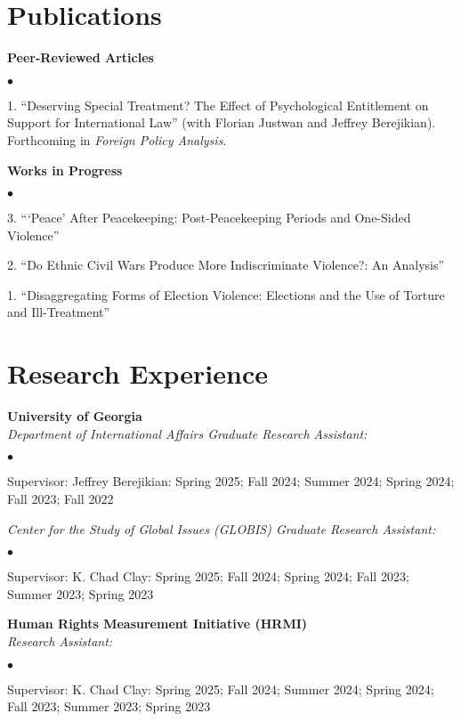 \documentclass[letterpaper,12pt]{article}
\newenvironment{list2}{
  \begin{list}{$\bullet$}{%
      \setlength{\itemsep}{0in}
      \setlength{\parsep}{0in} 
      \setlength{\parskip}{0in}
      \setlength{\topsep}{0in} 
      \setlength{\partopsep}{0in}
      \setlength{\leftmargin}{1in}
      \setlength{\labelsep}{1em}
      \setlength{\labelwidth}{1em}
      \setlength{\itemindent}{-2em}
      \setlength{\listparindent}{2em}}}{\end{list}}
\begin{document}
\section{Publications}
\textbf{Peer-Reviewed Articles}
\par
\begin{list2}
    \item[1.] ``Deserving Special Treatment? The Effect of Psychological Entitlement on Support for \mbox{International} Law” (with Florian Justwan and Jeffrey Berejikian). Forthcoming in \textit{Foreign Policy Analysis}.
    \end{list2}
\par
\textbf{Works in Progress}
\par
\begin{list2}
    \item[3.] ```Peace' After Peacekeeping: Post-Peacekeeping Periods and One-Sided Violence”
    \item[2.] ``Do Ethnic Civil Wars Produce More Indiscriminate Violence?: An Analysis”
    \item[1.] ``Disaggregating Forms of Election Violence: Elections and the Use of Torture and Ill-Treatment” 
\end{list2}

\section{Research Experience}
\textbf{University of Georgia}\\
\textit{Department of International Affairs Graduate Research Assistant:}
\begin{list2}
    \item Supervisor: Jeffrey Berejikian: Spring 2025; Fall 2024; Summer 2024; Spring 2024; Fall 2023; Fall 2022
\end{list2}
\par
\textit{Center for the Study of Global Issues (GLOBIS) Graduate Research Assistant:}
\begin{list2}
    \item Supervisor: K. Chad Clay: Spring 2025; Fall 2024; Spring 2024; Fall 2023; Summer 2023; Spring 2023
\end{list2}
\par
\textbf{Human Rights Measurement Initiative (HRMI)}\\
\textit{Research Assistant:}
\begin{list2}
    \item Supervisor: K. Chad Clay: Spring 2025; Fall 2024; Summer 2024; Spring 2024; Fall 2023; Summer 2023; Spring 2023
\end{list2}
\end{document}

